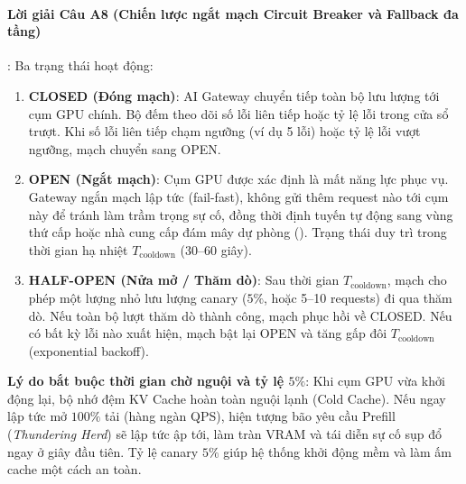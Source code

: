 \paragraph{Lời giải Câu A8 (Chiến lược ngắt mạch Circuit Breaker và Fallback đa tầng)}:
Ba trạng thái hoạt động:
\begin{enumerate}
  \item \textbf{CLOSED (Đóng mạch)}: AI Gateway chuyển tiếp toàn bộ lưu lượng tới cụm GPU chính. Bộ đếm theo dõi số lỗi liên tiếp hoặc tỷ lệ lỗi trong cửa sổ trượt. Khi số lỗi liên tiếp chạm ngưỡng (ví dụ 5 lỗi) hoặc tỷ lệ lỗi vượt ngưỡng, mạch chuyển sang OPEN.
  \item \textbf{OPEN (Ngắt mạch)}: Cụm GPU được xác định là mất năng lực phục vụ. Gateway ngắn mạch lập tức (fail-fast), không gửi thêm request nào tới cụm này để tránh làm trầm trọng sự cố, đồng thời định tuyến tự động sang vùng thứ cấp hoặc nhà cung cấp đám mây dự phòng (). Trạng thái duy trì trong thời gian hạ nhiệt $T_{\text{cooldown}}$ (30--60 giây).
  \item \textbf{HALF-OPEN (Nửa mở / Thăm dò)}: Sau thời gian $T_{\text{cooldown}}$, mạch cho phép một lượng nhỏ lưu lượng canary ($5\%$, hoặc 5--10 requests) đi qua thăm dò. Nếu toàn bộ lượt thăm dò thành công, mạch phục hồi về CLOSED. Nếu có bất kỳ lỗi nào xuất hiện, mạch bật lại OPEN và tăng gấp đôi $T_{\text{cooldown}}$ (exponential backoff).
\end{enumerate}
\textbf{Lý do bắt buộc thời gian chờ nguội và tỷ lệ $5\%$}: Khi cụm GPU vừa khởi động lại, bộ nhớ đệm KV Cache hoàn toàn nguội lạnh (Cold Cache). Nếu ngay lập tức mở $100\%$ tải (hàng ngàn QPS), hiện tượng bão yêu cầu Prefill (\textit{Thundering Herd}) sẽ lập tức ập tới, làm tràn VRAM và tái diễn sự cố sụp đổ ngay ở giây đầu tiên. Tỷ lệ canary $5\%$ giúp hệ thống khởi động mềm và làm ấm cache một cách an toàn.

